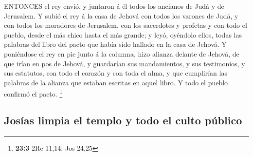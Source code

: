  ENTONCES el rey envió, y juntaron á él todos los ancianos
de Judá y de Jerusalem.  Y subió el rey á la casa de Jehová
con todos los varones de Judá, y con todos los moradores de Jerusalem,
con los sacerdotes y profetas y con todo el pueblo, desde el más chico
hasta el más grande; y leyó, oyéndolo ellos, todas las palabras del
libro del pacto que había sido hallado en la casa de Jehová.
 Y poniéndose el rey en pie junto á la columna, hizo alianza
delante de Jehová, de que irían en pos de Jehová, y guardarían sus
mandamientos, y sus testimonios, y sus estatutos, con todo el corazón y
con toda el alma, y que cumplirían las palabras de la alianza que
estaban escritas en aquel libro. Y todo el pueblo confirmó el pacto.
\footnote{\textbf{23:3} 2Re 11,14; Jos 24,25}

\hypertarget{josuxedas-limpia-el-templo-y-todo-el-culto-puxfablico}{%
\subsection{Josías limpia el templo y todo el culto
público}\label{josuxedas-limpia-el-templo-y-todo-el-culto-puxfablico}}

